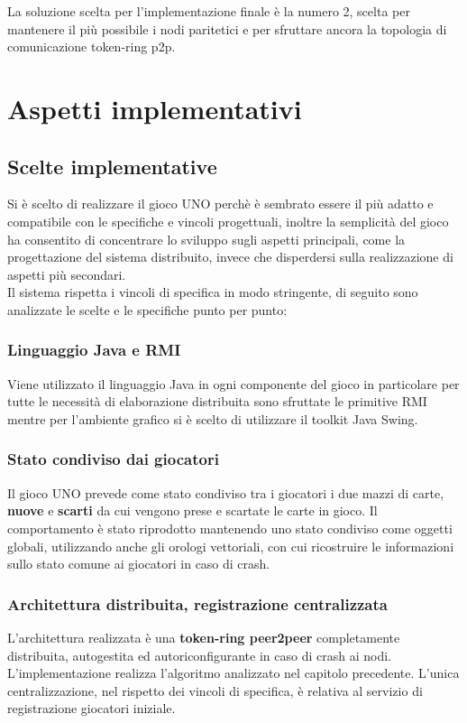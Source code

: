 \documentclass[10pt,a4paper]{article}
\begin{document}
La soluzione scelta per l'implementazione finale è la numero 2, scelta per mantenere il più possibile i nodi paritetici e per sfruttare ancora la topologia di comunicazione token-ring p2p. 

\section{Aspetti implementativi}
\subsection{Scelte implementative}
Si è scelto di realizzare il gioco UNO perchè è sembrato essere il più adatto e compatibile con le specifiche e vincoli progettuali, inoltre la semplicità del gioco ha consentito di concentrare lo sviluppo sugli aspetti principali, come la progettazione del sistema distribuito, invece che disperdersi sulla realizzazione di aspetti più secondari.\\
Il sistema rispetta i vincoli di specifica in modo stringente, di seguito sono analizzate le scelte e le specifiche punto per punto:

\subsubsection{Linguaggio Java e RMI}
Viene utilizzato il linguaggio Java in ogni componente del gioco in particolare per tutte le necessità di elaborazione distribuita sono sfruttate le primitive RMI mentre per l'ambiente grafico si è scelto di utilizzare il toolkit Java Swing.

\subsubsection{Stato condiviso dai giocatori}
Il gioco UNO prevede come stato condiviso tra i giocatori i due mazzi di carte, \textbf{nuove} e \textbf{scarti} da cui vengono prese e scartate le carte in gioco. Il comportamento è stato riprodotto mantenendo uno stato condiviso come oggetti globali, utilizzando anche gli orologi vettoriali, con cui ricostruire le informazioni sullo stato comune ai giocatori in caso di crash.
 
\subsubsection{Architettura distribuita, registrazione centralizzata}
L'architettura realizzata è una \textbf{token-ring peer2peer} completamente distribuita, autogestita ed autoriconfigurante in caso di crash ai nodi. L'implementazione realizza l'algoritmo analizzato nel capitolo precedente. L'unica centralizzazione, nel rispetto dei vincoli di specifica, è relativa al servizio di registrazione giocatori iniziale.
\end{document}
